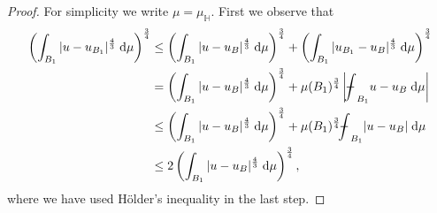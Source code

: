 \documentclass[10pt,letterpaper]{amsart}
\theoremstyle{definition}
\numberwithin{thm}{subsection}
\numberwithin{equation}{section}
\begin{document}
\begin{proof}
For simplicity we write $\mu=\mu_{\mathbb H}$. First we observe that
\begin{align*}
\left(\int_{B_1} |u-u_{B_1}|^{\frac{4}{3}}\;\mathrm{d}\mu\right)^{\frac{3}{4}}& \leq
\left(\int_{B_1} |u-u_{B}|^{\frac{4}{3}}\;\mathrm{d}\mu\right)^{\frac{3}{4}}+\left(\int_{B_1} |u_{B_1}-u_{B}|^{\frac{4}{3}}\;\mathrm{d}\mu\right)^{\frac{3}{4}}\\
&= \left(\int_{B_1} |u-u_{B}|^{\frac{4}{3}}\;\mathrm{d}\mu\right)^{\frac{3}{4}}
+ \mu(B_1)^{\frac{3}{4}}\left| {\mathchoice
          {\mathop{\vrule width 6pt height 3 pt depth -2.5pt
                  \kern -8pt \intop}\nolimits_{{B_1}}}          {\mathop{\vrule width 5pt height 3 pt depth -2.6pt
                  \kern -6pt \intop}\nolimits_{{B_1}}}          {\mathop{\vrule width 5pt height 3 pt depth -2.6pt
                  \kern -6pt \intop}\nolimits_{{B_1}}}          {\mathop{\vrule width 5pt height 3 pt depth -2.6pt
                  \kern -6pt \intop}\nolimits_{{B_1}}}} u -u_B \;\mathrm{d}\mu\right|\\
&\leq \left(\int_{B_1} |u-u_{B}|^{\frac{4}{3}}\;\mathrm{d}\mu\right)^{\frac{3}{4}}
+ \mu(B_1)^{\frac{3}{4}} {\mathchoice
          {\mathop{\vrule width 6pt height 3 pt depth -2.5pt
                  \kern -8pt \intop}\nolimits_{{B_1}}}          {\mathop{\vrule width 5pt height 3 pt depth -2.6pt
                  \kern -6pt \intop}\nolimits_{{B_1}}}          {\mathop{\vrule width 5pt height 3 pt depth -2.6pt
                  \kern -6pt \intop}\nolimits_{{B_1}}}          {\mathop{\vrule width 5pt height 3 pt depth -2.6pt
                  \kern -6pt \intop}\nolimits_{{B_1}}}} |u -u_B| \;\mathrm{d}\mu\\
&\leq 2 \left(\int_{B_1} |u-u_B|^{\frac{4}{3}}\;\mathrm{d}\mu\right)^{\frac{3}{4}},
\end{align*}
where we have used H\"older's inequality in the last step.


\end{proof}
\end{document}
